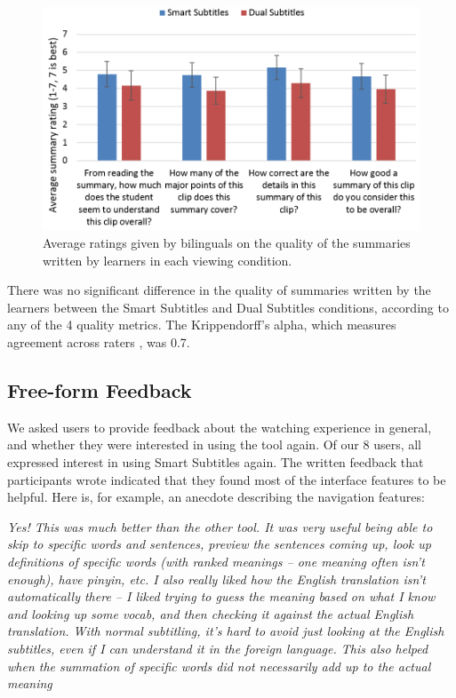 \documentclass{sigchi}
\begin{document}
\begin{figure}[!h]
\centering
\includegraphics[width=\columnwidth]{summary-ratings}
\caption{Average ratings given by bilinguals on the quality of the summaries written by learners in each viewing condition.}
\label{fig:figure9}
\end{figure}

There was no significant difference in the quality of summaries written
by the learners between the Smart Subtitles and Dual Subtitles conditions,
according to any of the 4 quality metrics. The Krippendorff's alpha,
which measures agreement across raters \cite{krippendorff}, was 0.7.

\subsection{Free-form Feedback}

We asked users to provide feedback about the watching experience in general, and whether they were interested in using the tool again. Of our 8 users, all expressed interest in using Smart Subtitles again. The written feedback that participants wrote indicated that they found most of the interface features to be helpful. Here is, for example, an anecdote describing the navigation features:
	 	 	
\emph{Yes! This was much better than the other tool. It was very useful being able to skip to specific words and sentences, preview the sentences coming up, look up definitions of specific words (with ranked meanings – one meaning often isn't enough), have pinyin, etc. I also really liked how the English translation isn't automatically there – I liked trying to guess the meaning based on what I know and looking up some vocab, and then checking it against the actual English translation. With normal subtitling, it's hard to avoid just looking at the English subtitles, even if I can understand it in the foreign language. This also helped when the summation of specific words did not necessarily add up to the actual meaning}
\end{document}
